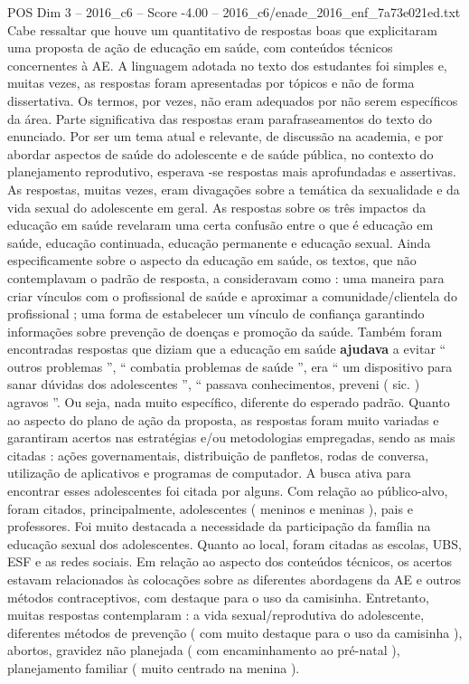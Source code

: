 \begin{textsample}{POS Dim 3 – 2016\_c6 – Score -4.00 – 2016\_c6/enade\_2016\_enf\_7a73e021ed.txt}
Cabe ressaltar que houve um quantitativo de respostas boas que explicitaram uma proposta de ação de educação em saúde, com conteúdos técnicos concernentes à AE.
A linguagem adotada no texto dos estudantes foi simples e, muitas vezes, as respostas foram apresentadas por tópicos e não de forma dissertativa.
Os termos, por vezes, não eram adequados por não serem específicos da área.
Parte significativa das respostas eram parafraseamentos do texto do enunciado.
Por ser um tema atual e relevante, de discussão na academia, e por abordar aspectos de saúde do adolescente e de saúde pública, no contexto do planejamento reprodutivo, esperava -se respostas mais aprofundadas e assertivas.
As respostas, muitas vezes, eram divagações sobre a temática da sexualidade e da vida sexual do adolescente em geral.
As respostas sobre os três impactos da educação em saúde revelaram uma certa confusão entre o que é educação em saúde, educação continuada, educação permanente e educação sexual.
Ainda especificamente sobre o aspecto da educação em saúde, os textos, que não contemplavam o padrão de resposta, a consideravam como : uma maneira para criar vínculos com o profissional de saúde e aproximar a comunidade/clientela do profissional ; uma forma de estabelecer um vínculo de confiança garantindo informações sobre prevenção de doenças e promoção da saúde.
Também foram encontradas respostas que diziam que a educação em saúde \textbf{ajudava} a evitar “ outros problemas ”, “ combatia problemas de saúde ”, era “ um dispositivo para sanar dúvidas dos adolescentes ”, “ passava conhecimentos, preveni ( sic. ) agravos ”.
Ou seja, nada muito específico, diferente do esperado padrão.
Quanto ao aspecto do plano de ação da proposta, as respostas foram muito variadas e garantiram acertos nas estratégias e/ou metodologias empregadas, sendo as mais citadas : ações governamentais, distribuição de panfletos, rodas de conversa, utilização de aplicativos e programas de computador.
A busca ativa para encontrar esses adolescentes foi citada por alguns.
Com relação ao público-alvo, foram citados, principalmente, adolescentes ( meninos e meninas ), pais e professores.
Foi muito destacada a necessidade da participação da família na educação sexual dos adolescentes.
Quanto ao local, foram citadas as escolas, UBS, ESF e as redes sociais.
Em relação ao aspecto dos conteúdos técnicos, os acertos estavam relacionados às colocações sobre as diferentes abordagens da AE e outros métodos contraceptivos, com destaque para o uso da camisinha.
Entretanto, muitas respostas contemplaram : a vida sexual/reprodutiva do adolescente, diferentes métodos de prevenção ( com muito destaque para o uso da camisinha ), abortos, gravidez não planejada ( com encaminhamento ao pré-natal ), planejamento familiar ( muito centrado na menina ).

\end{textsample}
